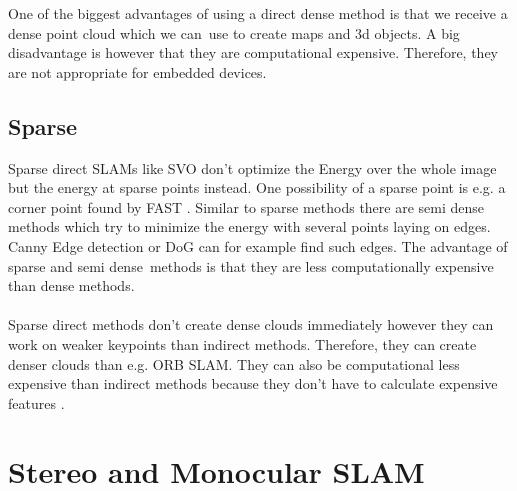 \documentclass[11pt,a4paper,titlepage,oneside]{report}
\begin{document}
One of the biggest advantages of using a direct dense method is that we receive a dense point cloud which we can use to create maps and 3d objects. A big disadvantage is however that they are computational expensive. Therefore, they are not appropriate for embedded devices.

\subsection{Sparse}

Sparse direct SLAMs like SVO \cite{svo} don’t optimize the Energy over the whole image but the energy at sparse points instead. One possibility of a sparse point is e.g. a corner point found by FAST \cite{fast}. Similar to sparse methods there are semi dense methods which try to minimize the energy with several points laying on edges. Canny Edge detection or DoG can for example find such edges. The advantage of sparse and semi dense methods is that they are less computationally expensive than dense methods.\\\\

Sparse direct methods don’t create dense clouds immediately however they can work on weaker keypoints than indirect methods. Therefore, they can create denser clouds than e.g. ORB SLAM. They can also be computational less expensive than indirect methods because they don’t have to calculate expensive features \cite{svo}.

\section{Stereo and Monocular SLAM}
\end{document}
